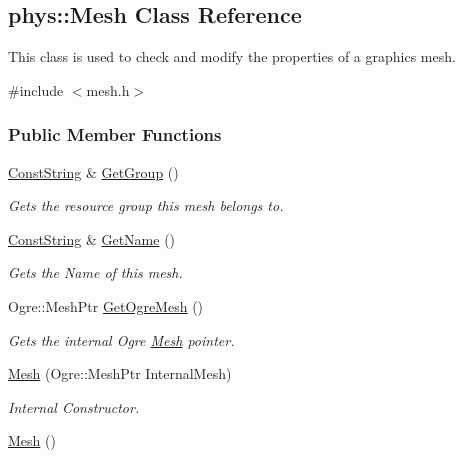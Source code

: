 \hypertarget{classphys_1_1Mesh}{
\subsection{phys::Mesh Class Reference}
\label{classphys_1_1Mesh}
}


This class is used to check and modify the properties of a graphics mesh.  




{\ttfamily \#include $<$mesh.h$>$}

\subsubsection*{Public Member Functions}
\begin{DoxyCompactItemize}
\item 
\hyperlink{namespacephys_a5ce5049f8b4bf88d6413c47b504ebb31}{ConstString} \& \hyperlink{classphys_1_1Mesh_ad4dcc1dc077b42c98821fc9eeaae7471}{GetGroup} ()
\begin{DoxyCompactList}\small\item\em Gets the resource group this mesh belongs to. \item\end{DoxyCompactList}\item 
\hyperlink{namespacephys_a5ce5049f8b4bf88d6413c47b504ebb31}{ConstString} \& \hyperlink{classphys_1_1Mesh_a5a8e1b4d799909a94c62ee1bcb4e96d9}{GetName} ()
\begin{DoxyCompactList}\small\item\em Gets the Name of this mesh. \item\end{DoxyCompactList}\item 
Ogre::MeshPtr \hyperlink{classphys_1_1Mesh_af553e10686dd2d87b00f4087edc96ed8}{GetOgreMesh} ()
\begin{DoxyCompactList}\small\item\em Gets the internal Ogre \hyperlink{classphys_1_1Mesh}{Mesh} pointer. \item\end{DoxyCompactList}\item 
\hyperlink{classphys_1_1Mesh_a81a073c578feb902c4cb4b9cef3e88ee}{Mesh} (Ogre::MeshPtr InternalMesh)
\begin{DoxyCompactList}\small\item\em Internal Constructor. \item\end{DoxyCompactList}\item 
\hypertarget{classphys_1_1Mesh_a4e606e127ed671fe2e35946f523d1ded}{
\hyperlink{classphys_1_1Mesh_a4e606e127ed671fe2e35946f523d1ded}{Mesh} ()}
\label{classphys_1_1Mesh_a4e606e127ed671fe2e35946f523d1ded}


\end{DoxyCompactItemize}
